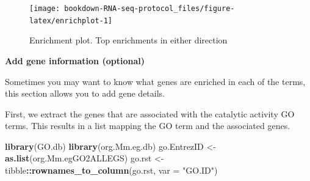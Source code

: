 \documentclass[]{book}
\newenvironment{Shaded}{\begin{snugshade}}{\end{snugshade}}
\newcommand{\DataTypeTok}[1]{\textcolor[rgb]{0.13,0.29,0.53}{#1}}
\newcommand{\KeywordTok}[1]{\textcolor[rgb]{0.13,0.29,0.53}{\textbf{#1}}}
\newcommand{\NormalTok}[1]{#1}
\newcommand{\OperatorTok}[1]{\textcolor[rgb]{0.81,0.36,0.00}{\textbf{#1}}}
\newcommand{\StringTok}[1]{\textcolor[rgb]{0.31,0.60,0.02}{#1}}
\begin{document}
\begin{figure}

{\centering \texttt{[image: bookdown-RNA-seq-protocol\_files/figure-latex/enrichplot-1]} 

}

\caption{Enrichment plot. Top enrichments in either direction}\label{fig:enrichplot}
\end{figure}

\textbf{Add gene information (optional)}

Sometimes you may want to know what genes are enriched in each of the terms, this section allows you to add gene details.

First, we extract the genes that are associated with the catalytic activity GO terms. This results in a list mapping the GO term and the associated genes.

\begin{Shaded}
\begin{Highlighting}[]
\KeywordTok{library}\NormalTok{(GO.db)}
\KeywordTok{library}\NormalTok{(org.Mm.eg.db)}
\NormalTok{go.EntrezID <-}\StringTok{ }\KeywordTok{as.list}\NormalTok{(org.Mm.egGO2ALLEGS)}
\NormalTok{go.rst <-}\StringTok{ }\NormalTok{tibble}\OperatorTok{::}\KeywordTok{rownames_to_column}\NormalTok{(go.rst, }\DataTypeTok{var =} \StringTok{"GO.ID"}\NormalTok{)}
\end{Highlighting}
\end{Shaded}
\end{document}
